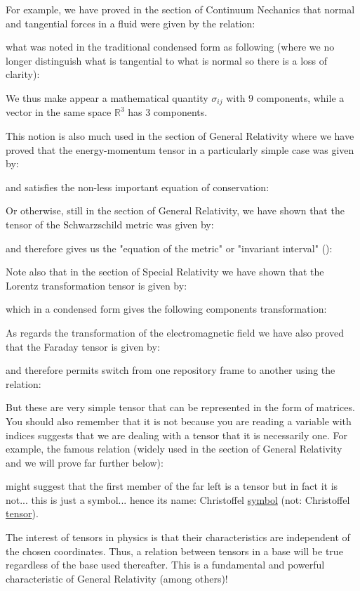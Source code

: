 	\label{tensor notation}For example, we have proved in the section of Continuum Nechanics that normal and tangential forces in a fluid were given by the relation:
	
	what was noted in the traditional condensed form as following (where we no longer distinguish what is tangential to what is normal so there is a loss of clarity):
	
	We thus make appear a mathematical quantity $\sigma_{ij}$ with $9$ components, while a vector in the same space $\mathbb{R}^3$ has $3$ components.
	
	This notion is also much used in the section of General Relativity where we have proved that the energy-momentum tensor in a particularly simple case was given by:
	
	and satisfies the non-less important equation of conservation:
	
	Or otherwise, still in the section of General Relativity, we have shown that the tensor of the Schwarzschild metric was given by:
	
	and therefore gives us the "equation of the metric" or "invariant interval" ():
	
	Note also that in the section of Special Relativity we have shown that the Lorentz transformation tensor is given by:
	
	which in a condensed form gives the following components transformation:
	
	As regards the transformation of the electromagnetic field we have also proved that the Faraday tensor is given by:
	
	and therefore permits switch from one repository frame to another using the relation:
	
	But these are very simple tensor that can be represented in the form of matrices. You should also remember that it is not because you are reading a variable with indices suggests that we are dealing with a tensor that it is necessarily one. For example, the famous relation (widely used in the section of General Relativity and we will prove far further below):
	
	might suggest that the first member of the far left is a tensor but in fact it is not... this is just a symbol... hence its name: Christoffel \underline{symbol} (not: Christoffel \underline{tensor}).
	
	The interest of tensors in physics is that their characteristics are independent of the chosen coordinates. Thus, a relation between tensors in a base will be true regardless of the base used thereafter. This is a fundamental and powerful characteristic of General Relativity (among others)!
	
